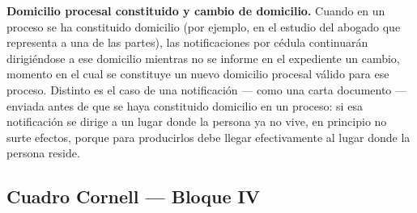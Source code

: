 \documentclass[12pt,oneside]{book}
\begin{document}
\begin{note}
\textbf{Domicilio procesal constituido y cambio de domicilio.} Cuando en un proceso se ha constituido domicilio (por ejemplo, en el estudio del abogado que representa a una de las partes), las notificaciones por cédula continuarán dirigiéndose a ese domicilio mientras no se informe en el expediente un cambio, momento en el cual se constituye un nuevo domicilio procesal válido para ese proceso. Distinto es el caso de una notificación --- como una carta documento --- enviada antes de que se haya constituido domicilio en un proceso: si esa notificación se dirige a un lugar donde la persona ya no vive, en principio no surte efectos, porque para producirlos debe llegar efectivamente al lugar donde la persona reside.
\end{note}

\subsection*{Cuadro Cornell --- Bloque IV}
\end{document}
